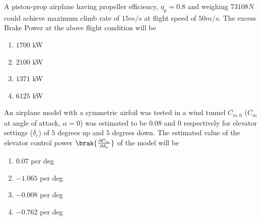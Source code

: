 	\item A piston-prop airplane having propeller efficiency, $\eta_p = 0.8$ and weighing $73108 N$ could achieve maximum climb rate of $15m/s$ at flight speed of $50m/s$. The excess Brake Power  at the above flight condition will be
		\begin{enumerate}
			\item $1700$ kW
			\item $2100$ kW
			\item $1371$ kW
			\item $6125$ kW
		\end{enumerate}
	\item An airplane model with a symmetric airfoil was tested in a wind tunnel $C_{m,0}$ ($C_m$ at angle of attack, $\alpha = 0$) was estimated to be $0.08$ and $0$ respectively for elevator settings ($\delta _ e$) of $5$ degrees up and $5$ degrees down. The estimated value of the elevator control power $\brak{\frac{\partial C_m}{\partial \delta _ e}}$ of the model will be 
		\begin{enumerate}
			\item $0.07$ per deg
			\item $-1.065$ per deg
			\item $-0.008$ per deg
			\item $-0.762$ per deg
		\end{enumerate}


